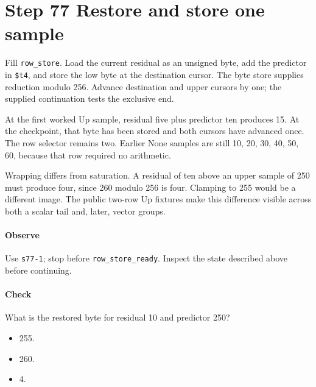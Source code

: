 \section{Step 77 Restore and store one sample}
Fill \texttt{row\_store}. Load the current residual as an unsigned byte, add the predictor in \texttt{\$t4}, and store the low byte at the destination cursor. The byte store supplies reduction modulo 256. Advance destination and upper cursors by one; the supplied continuation tests the exclusive end.

At the first worked Up sample, residual five plus predictor ten produces 15. At the checkpoint, that byte has been stored and both cursors have advanced once. The row selector remains two. Earlier None samples are still 10, 20, 30, 40, 50, 60, because that row required no arithmetic.

Wrapping differs from saturation. A residual of ten above an upper sample of 250 must produce four, since 260 modulo 256 is four. Clamping to 255 would be a different image. The public two-row Up fixtures make this difference visible across both a scalar tail and, later, vector groups.

\paragraph{Observe} Use \texttt{s77-1}; stop before \texttt{row\_store\_ready}. Inspect the state described above before continuing.

\paragraph{Check} What is the restored byte for residual 10 and predictor 250?
\begin{itemize}
  \item[A.] 255.
  \item[B.] 260.
  \item[C.] 4.
\end{itemize}
